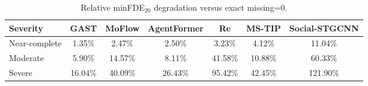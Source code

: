 \begin{table}[t]
  \centering
  \caption{Three-level missing-history stratification by missing percentage
  of the eight-frame history. Each bin is averaged equally over its exact
  discrete levels, then over scenes.}
  \label{tab:tgbench-severity}
  \small
  \setlength{\tabcolsep}{2pt}
\end{table}

\begin{table}[t]
  \centering
  \caption{Relative minFDE$_{20}$ degradation versus exact missing=0.}
  \label{tab:tgbench-severity-relative}
  \small
  \setlength{\tabcolsep}{3pt}
  \begin{tabular}{l c c c c c c }
    \toprule
    Severity & GAST & MoFlow & AgentFormer & Re & MS-TIP & Social-STGCNN \\
    \midrule
    Near-complete & 1.35\% & 2.47\% & 2.50\% & 3.23\% & 4.12\% & 11.04\% \\
    Moderate & 5.90\% & 14.57\% & 8.11\% & 41.58\% & 10.88\% & 60.33\% \\
    Severe & 16.04\% & 40.09\% & 26.43\% & 95.42\% & 42.45\% & 121.90\% \\
    \bottomrule
  \end{tabular}
\end{table}

